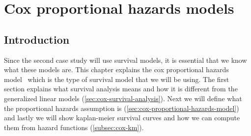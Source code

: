 \chapter{Cox proportional hazards models}
\label{cha:cox}

\section{Introduction}
\label{sec:cox-introduction}
Since the second case study will use survival models, it is essential that we know what these models are. This chapter explains the cox proportional hazards model~\cite{simon2011regularization}\cite{tibshirani1997lasso}\cite{wikicox} which is the type of survival model that we will be using. The first section explains what survival analysis means and how it is different from the generalized linear models (\ref{sec:cox-survival-analysis}). Next we will define what the proportional hazards assumption is (\ref{sec:cox-proportional-hazards-model}) and lastly we will show kaplan-meier survival curves and how we can compute them from hazard functions (\ref{subsec:cox-km}).

